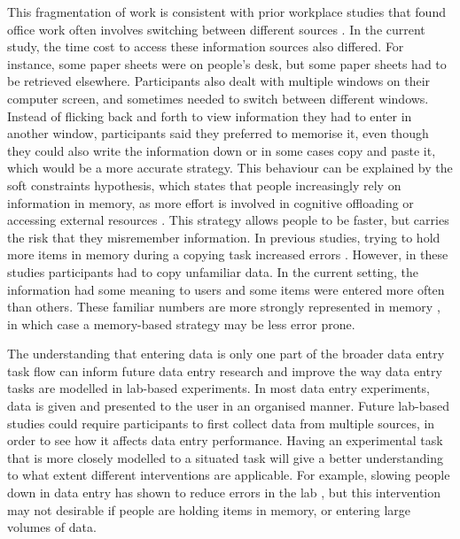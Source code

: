 This fragmentation of work is consistent with prior workplace studies that found  office work often involves switching between different sources \citep{Cangiano2009, Czerwinski2004, Mark2005, Sellberg2014}. In the current study, the time cost to access these information sources also differed. For instance, some paper sheets were on people's desk, but some paper sheets had to be retrieved elsewhere. Participants also dealt with multiple windows on their computer screen, and sometimes needed to switch between different windows. Instead of flicking back and forth to view information they had to enter in another window, participants said they preferred to memorise it, even though they could also write the information down or in some cases copy and paste it, which would be a more accurate strategy. This behaviour can be explained by the soft constraints hypothesis, which states that people increasingly rely on information in memory, as more effort is involved in cognitive offloading or accessing external resources \citep{Gray2006}. This strategy allows people to be faster, but carries the risk that they misremember information. In previous studies, trying to hold more items in memory during a copying task increased errors \citep[e.g.][]{Borghouts2015, Morgan2009}. However, in these studies participants had to copy unfamiliar data. In the current setting, the information had some meaning to users and some items were entered more often than others. These familiar numbers are more strongly represented in memory \citep{Wiseman2014}, in which case a memory-based strategy may be less error prone.

The understanding that entering data is only one part of the broader data entry task flow can inform future data entry research and improve the way data entry tasks are modelled in lab-based experiments. In most data entry experiments, data is given and presented to the user in an organised manner. Future lab-based studies could require participants to first collect data from multiple sources, in order to see how it affects data entry performance. Having an experimental task that is more closely modelled to a situated task will give a better understanding to what extent different interventions are applicable. For example, slowing people down in data entry has shown to reduce errors in the lab \citep{Gould2016, Wiseman2013a}, but this intervention may not desirable if people are holding items in memory, or entering large volumes of data.

